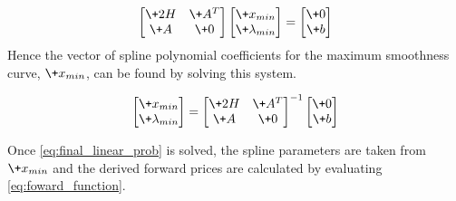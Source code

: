 \documentclass{article}
\begin{document}
\begin{equation}
    \begin{bmatrix}
        \+{2H} & \+{A^T} \\
        \+{A} & \+{0}
    \end{bmatrix}
    \begin{bmatrix}
        \+{x_{min}} \\
        \+{\lambda_{min}}
    \end{bmatrix} = 
    \begin{bmatrix}
        \+{0} \\
        \+{b}
    \end{bmatrix}
\end{equation}
Hence the vector of spline polynomial coefficients for the maximum smoothness curve, $\+{x_{min}}$,
can be found by solving this system.

\begin{equation}
    \label{eq:final_linear_prob}
    \begin{bmatrix}
        \+{x_{min}} \\
        \+{\lambda_{min}}
    \end{bmatrix} = 
    \begin{bmatrix}
        \+{2H} & \+{A^T} \\
        \+{A} & \+{0}
    \end{bmatrix}^{-1}
    \begin{bmatrix}
        \+{0} \\
        \+{b}
    \end{bmatrix}
\end{equation}

Once \ref{eq:final_linear_prob} is solved, the spline parameters are taken from $\+{x_{min}}$
and the derived forward prices are calculated by evaluating \ref{eq:foward_function}.





\end{document}
